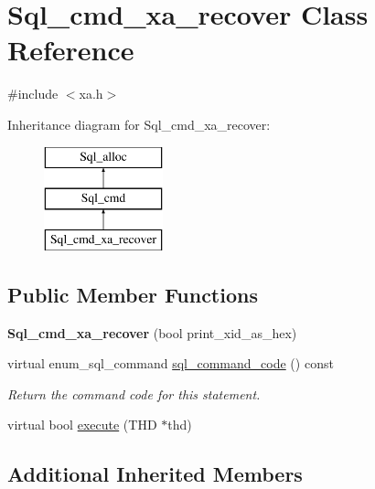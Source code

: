 \hypertarget{classSql__cmd__xa__recover}{}\section{Sql\+\_\+cmd\+\_\+xa\+\_\+recover Class Reference}
\label{classSql__cmd__xa__recover}


{\ttfamily \#include $<$xa.\+h$>$}

Inheritance diagram for Sql\+\_\+cmd\+\_\+xa\+\_\+recover\+:\begin{figure}[H]
\begin{center}
\leavevmode
\includegraphics[height=3.000000cm]{classSql__cmd__xa__recover}
\end{center}
\end{figure}
\subsection*{Public Member Functions}
\begin{DoxyCompactItemize}
\item 
\mbox{\label{classSql__cmd__xa__recover_acff58b55340747d05b460c46ba9ec468}} 
{\bfseries Sql\+\_\+cmd\+\_\+xa\+\_\+recover} (bool print\+\_\+xid\+\_\+as\+\_\+hex)
\item 
\mbox{\label{classSql__cmd__xa__recover_ae6e32848f930d36a15b0857086191daa}} 
virtual enum\+\_\+sql\+\_\+command \mbox{\hyperlink{classSql__cmd__xa__recover_ae6e32848f930d36a15b0857086191daa}{sql\+\_\+command\+\_\+code}} () const
\begin{DoxyCompactList}\small\item\em Return the command code for this statement. \end{DoxyCompactList}\item 
virtual bool \mbox{\hyperlink{classSql__cmd__xa__recover_a48a61d21f733c261c49e5f93d7ecec26}{execute}} (T\+HD $\ast$thd)
\end{DoxyCompactItemize}
\subsection*{Additional Inherited Members}


